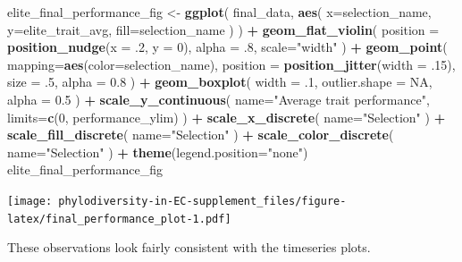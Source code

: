 \documentclass[]{book}
\newenvironment{Shaded}{\begin{snugshade}}{\end{snugshade}}
\newcommand{\DataTypeTok}[1]{\textcolor[rgb]{0.13,0.29,0.53}{#1}}
\newcommand{\DecValTok}[1]{\textcolor[rgb]{0.00,0.00,0.81}{#1}}
\newcommand{\FloatTok}[1]{\textcolor[rgb]{0.00,0.00,0.81}{#1}}
\newcommand{\KeywordTok}[1]{\textcolor[rgb]{0.13,0.29,0.53}{\textbf{#1}}}
\newcommand{\NormalTok}[1]{#1}
\newcommand{\OperatorTok}[1]{\textcolor[rgb]{0.81,0.36,0.00}{\textbf{#1}}}
\newcommand{\OtherTok}[1]{\textcolor[rgb]{0.56,0.35,0.01}{#1}}
\newcommand{\StringTok}[1]{\textcolor[rgb]{0.31,0.60,0.02}{#1}}
\begin{document}
\begin{Shaded}
\begin{Highlighting}[]
\NormalTok{elite_final_performance_fig <-}\StringTok{ }\KeywordTok{ggplot}\NormalTok{(}
\NormalTok{    final_data,}
    \KeywordTok{aes}\NormalTok{(}
      \DataTypeTok{x=}\NormalTok{selection_name,}
      \DataTypeTok{y=}\NormalTok{elite_trait_avg,}
      \DataTypeTok{fill=}\NormalTok{selection_name}
\NormalTok{    )}
\NormalTok{  ) }\OperatorTok{+}
\StringTok{  }\KeywordTok{geom_flat_violin}\NormalTok{(}
    \DataTypeTok{position =} \KeywordTok{position_nudge}\NormalTok{(}\DataTypeTok{x =} \FloatTok{.2}\NormalTok{, }\DataTypeTok{y =} \DecValTok{0}\NormalTok{),}
    \DataTypeTok{alpha =} \FloatTok{.8}\NormalTok{,}
    \DataTypeTok{scale=}\StringTok{"width"}
\NormalTok{  ) }\OperatorTok{+}
\StringTok{  }\KeywordTok{geom_point}\NormalTok{(}
    \DataTypeTok{mapping=}\KeywordTok{aes}\NormalTok{(}\DataTypeTok{color=}\NormalTok{selection_name),}
    \DataTypeTok{position =} \KeywordTok{position_jitter}\NormalTok{(}\DataTypeTok{width =} \FloatTok{.15}\NormalTok{),}
    \DataTypeTok{size =} \FloatTok{.5}\NormalTok{,}
    \DataTypeTok{alpha =} \FloatTok{0.8}
\NormalTok{  ) }\OperatorTok{+}
\StringTok{  }\KeywordTok{geom_boxplot}\NormalTok{(}
    \DataTypeTok{width =} \FloatTok{.1}\NormalTok{,}
    \DataTypeTok{outlier.shape =} \OtherTok{NA}\NormalTok{,}
    \DataTypeTok{alpha =} \FloatTok{0.5}
\NormalTok{  ) }\OperatorTok{+}
\StringTok{  }\KeywordTok{scale_y_continuous}\NormalTok{(}
    \DataTypeTok{name=}\StringTok{"Average trait performance"}\NormalTok{,}
    \DataTypeTok{limits=}\KeywordTok{c}\NormalTok{(}\DecValTok{0}\NormalTok{, performance_ylim)}
\NormalTok{  ) }\OperatorTok{+}
\StringTok{  }\KeywordTok{scale_x_discrete}\NormalTok{(}
    \DataTypeTok{name=}\StringTok{"Selection"}
\NormalTok{  ) }\OperatorTok{+}
\StringTok{  }\KeywordTok{scale_fill_discrete}\NormalTok{(}
    \DataTypeTok{name=}\StringTok{"Selection"}
\NormalTok{  ) }\OperatorTok{+}
\StringTok{  }\KeywordTok{scale_color_discrete}\NormalTok{(}
    \DataTypeTok{name=}\StringTok{"Selection"}
\NormalTok{  ) }\OperatorTok{+}\StringTok{ }
\StringTok{  }\KeywordTok{theme}\NormalTok{(}\DataTypeTok{legend.position=}\StringTok{"none"}\NormalTok{)}
\NormalTok{elite_final_performance_fig}
\end{Highlighting}
\end{Shaded}

\texttt{[image: phylodiversity-in-EC-supplement\_files/figure-latex/final\_performance\_plot-1.pdf]}

These observations look fairly consistent with the timeseries plots.
\end{document}
